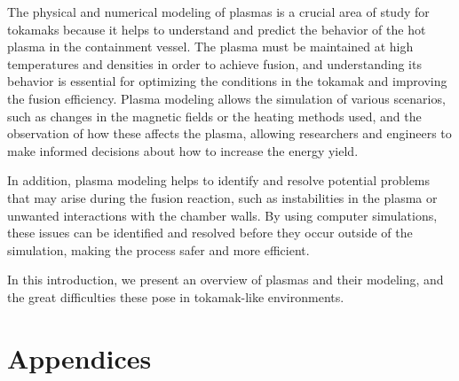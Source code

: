 \documentclass[12pt, a4paper]{article}
\begin{document}
    \shortline

    The physical and numerical modeling of plasmas is a crucial area of study for tokamaks because it helps to understand and predict the behavior of the hot plasma in the containment vessel. The plasma must be maintained at high temperatures and densities in order to achieve fusion, and understanding its behavior is essential for optimizing the conditions in the tokamak and improving the fusion efficiency. Plasma modeling allows the simulation of various scenarios, such as changes in the magnetic fields or the heating methods used, and the observation of how these affects the plasma, allowing researchers and engineers to make informed decisions about how to increase the energy yield.
    
    In addition, plasma modeling helps to identify and resolve potential problems that may arise during the fusion reaction, such as instabilities in the plasma or unwanted interactions with the chamber walls. By using computer simulations, these issues can be identified and resolved before they occur outside of the simulation, making the process safer and more efficient.
    
    \shortline

    In this introduction, we present an overview of plasmas and their modeling, and the great difficulties these pose in tokamak-like environments.



    
    
    
    
    \newpage
        \printbibliography
    
    
    \newpage
    \appendix
        \part{Appendices}
            
\end{document}
